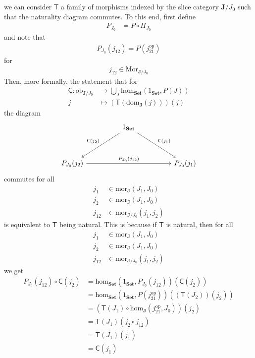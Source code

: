 we can consider $\mathsf{T}$ a family of morphisms indexed by the slice category $\mathbf{J} \slash J_{0}$ such that the naturality diagram commutes.
To this end, first define
\begin{align*}
  P_{J_{0}}
  &=
  P
  \circ
  \Pi_{J_{0}}
\end{align*}
and note that
\begin{align*}
  P_{J_{0}}(j_{12})
  =
  P(j_{21}^{\textrm{op}})
\end{align*}
for
\begin{align*}
  j_{12}
  \in
  \mathrm{Mor}_{\mathbf{J} \slash J_{0}}
\end{align*}
Then, more formally, the statement that for
\begin{align*}
  \mathsf{C}
  \colon
  \mathrm{ob}_{\mathbf{J} \slash J_{0}}
  &\rightarrow
  \bigcup_{J}
  \mathrm{hom}_{\mathbf{Set}}(1_{\mathbf{Set}},P(J))
  \\
  j
  &\mapsto
  (\mathsf{T}(\mathrm{dom}_{\mathbf{J}}(j)))(j)
\end{align*}
the diagram
\[
\begin{tikzcd}[sep=huge]
  &
  1_{\mathbf{Set}}
  \arrow{dr}{\mathsf{C}(j_{1})}
  \arrow[swap]{dl}{\mathsf{C}(j_{2})}
  &
  \\
  P_{J_{0}}(j_{2})
  \arrow{rr}{P_{J_{0}}(j_{12})}
  &
  &
  P_{J_{0}}(j_{1})
\end{tikzcd}
\]
commutes for all
\begin{align*}
  j_{1}
  &\in
  \mathrm{mor}_{\mathbf{J}}(J_{1},J_{0})
  \\
  j_{2}
  &\in
  \mathrm{mor}_{\mathbf{J}}(J_{1},J_{0})
  \\
  j_{12}
  &\in
  \mathrm{mor}_{\mathbf{J} \slash J_{0}}(j_{1},j_{2})
\end{align*}
is equivalent to $\mathsf{T}$ being natural.
This is because if $\mathsf{T}$ is natural, then for all
\begin{align*}
  j_{1}
  &\in
  \mathrm{mor}_{\mathbf{J}}(J_{1},J_{0})
  \\
  j_{2}
  &\in
  \mathrm{mor}_{\mathbf{J}}(J_{1},J_{0})
  \\
  j_{12}
  &\in
  \mathrm{mor}_{\mathbf{J} \slash J_{0}}(j_{1},j_{2})
\end{align*}
we get
\begin{align*}
  P_{J_{0}}(j_{12})
  \circ
  \mathsf{C}(j_{2})
  &=
  \mathrm{hom}_{\mathbf{Set}}(1_{\mathbf{Set}},P_{J_{0}}(j_{12}))
  (\mathsf{C}(j_{2}))
  \\
  &=
  \mathrm{hom}_{\mathbf{Set}}
  \left(
    1_{\mathbf{Set}},
    P(j_{21}^{\textrm{op}})
  \right)
  \left(
    (\mathsf{T}(J_{2}))(j_{2})
  \right)
  \\
  &=
  \left(
    \mathsf{T}(J_{1})
    \circ
    \mathrm{hom}_{\mathbf{J}}
    \left(
      j_{21}^{\textrm{op}},
      J_{0}
    \right)
  \right)
  (j_{2})
  \tag{NT}
  \\
  &=
  \mathsf{T}(J_{1})
  \left(
    j_{2}
    \circ
    j_{12}
  \right)
  \\
  &=
  \mathsf{T}(J_{1})(j_{1})
  \\
  &=
  \mathsf{C}(j_{1})
\end{align*}
